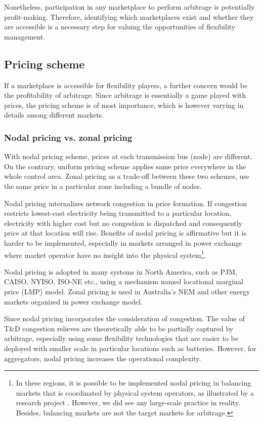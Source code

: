 Nonetheless, participation in any marketplace to perform arbitrage is potentially profit-making. Therefore, identifying which marketplaces exist and whether they are accessible is a necessary step for valuing the opportunities of flexibility management.

\subsection{Pricing scheme}
If a marketplace is accessible for flexibility players, a further concern would be the profitability of arbitrage. Since arbitrage is essentially a game played with prices, the pricing scheme is of most importance, which is however varying in details among different markets.

\subsubsection{Nodal pricing vs. zonal pricing}
With nodal pricing scheme, prices at each transmission bus (node) are different. On the contrary, uniform pricing scheme applies same price everywhere in the whole control area. Zonal pricing as a trade-off between these two schemes, use the same price in a particular zone including a bundle of nodes.

Nodal pricing internalizes network congestion in price formation. If congestion restricts lowest-cost electricity being transmitted to a particular location, electricity with higher cost but no congestion is dispatched and consequently price at that location will rise. Benefits of nodal pricing is affirmative \cite{Wang2015} but it is harder to be implemented, especially in markets arranged in power exchange where market operator have no insight into the physical system\footnote{In these regions, it is possible to be implemented nodal pricing in balancing markets that is coordinated by physical system operators, as illustrated by a research project \cite{Ecogrid}. However, we did see any large-scale practice in reality. Besides, balancing markets are not the target markets for arbitrage.}. 

Nodal pricing is adopted in many systems in North America, such as PJM, CAISO, NYISO, ISO-NE etc., using a mechanism named locational marginal price (LMP) model. Zonal pricing is used in Australia's NEM and other energy markets organized in power exchange model. 

Since nodal pricing incorporates the consideration of congestion. The value of T\&D congestion relieves are theoretically able to be partially captured by arbitrage, especially using some flexibility technologies that are easier to be deployed with smaller scale in particular locations such as batteries. However, for aggregators, nodal pricing increases the operational complexity.

